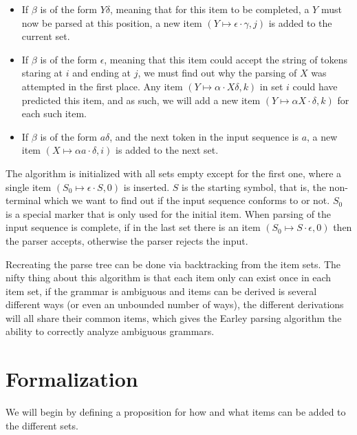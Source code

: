 		\begin{itemize}
			\item 
				If $\beta$ is of the form $Y\delta$, meaning that for this item
				to be completed, a $Y$ must now be parsed at this position, a 
				new item $(Y \mapsto \epsilon \cdot \gamma, j)$ is added to the 
				current set.
			
			\item
				If $\beta$ is of the form $\epsilon$, meaning that this item
				could accept the string of tokens staring at $i$ and ending at
				$j$, we must find out why the parsing of $X$ was attempted in
				the first place. Any item $(Y \mapsto \alpha \cdot X\delta, k)$
				in set $i$  could have predicted this item, and as such, we
				will add a new item $(Y \mapsto \alpha X \cdot \delta, k)$ for 
				each such item.
			
			\item
				If $\beta$ is of the form $a\delta$, and the next token in the 
				input sequence is $a$, a new item 
				$(X \mapsto \alpha a \cdot \delta, i)$ is added to the next 
				set.

		\end{itemize}
		
		The algorithm is initialized with all sets empty except for the first
		one, where a single item $(S_0 \mapsto \epsilon \cdot S, 0)$ is
		inserted.  $S$ is the starting symbol, that is, the non-terminal which
		we want to find out if the input sequence conforms to or not. $S_0$ is
		a special marker that is only used for the initial item. When parsing
		of the input sequence is complete, if in the last set there is an item
		$(S_0 \mapsto S \cdot \epsilon, 0)$ then the parser accepts, otherwise
		the parser rejects the input.

		Recreating the parse tree can be done via backtracking from the item 
		sets. The nifty thing about this algorithm is that each item only can 
		exist once in each item set, if the grammar is ambiguous and items can 
		be derived is several different ways (or even an unbounded number of 
		ways), the different derivations will all share their common items, 
		which gives the Earley parsing algorithm the ability to correctly 
		analyze ambiguous grammars.

	\section{Formalization}
		
		We will begin by defining a proposition for how and what items can be 
		added to the different sets.


